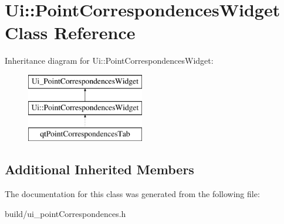 \hypertarget{class_ui_1_1_point_correspondences_widget}{}\section{Ui\+:\+:Point\+Correspondences\+Widget Class Reference}
\label{class_ui_1_1_point_correspondences_widget}
Inheritance diagram for Ui\+:\+:Point\+Correspondences\+Widget\+:\begin{figure}[H]
\begin{center}
\leavevmode
\includegraphics[height=3.000000cm]{class_ui_1_1_point_correspondences_widget}
\end{center}
\end{figure}
\subsection*{Additional Inherited Members}


The documentation for this class was generated from the following file\+:\begin{DoxyCompactItemize}
\item 
build/ui\+\_\+point\+Correspondences.\+h\end{DoxyCompactItemize}
